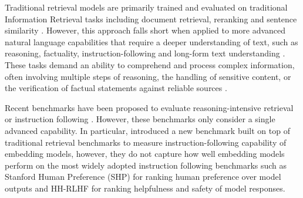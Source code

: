 


Traditional retrieval models are primarily trained and evaluated on traditional Information Retrieval tasks including document retrieval, reranking and sentence similarity \citep{muennighoff-etal-2023-mteb}. However, this approach falls short when applied to more advanced natural language capabilities that require a deeper understanding of text, such as reasoning, factuality, instruction-following and long-form text understanding \citep{su2024brightrealisticchallengingbenchmark, xiao2024rarbreasoningretrievalbenchmark, weller2024followirevaluatingteachinginformation}. These tasks demand an ability to comprehend and process complex information, often involving multiple steps of reasoning, the handling of sensitive content, or the verification of factual statements against reliable sources \citep{vu2024foundationalautoraterstaminglarge, ji2023beavertails, su2024brightrealisticchallengingbenchmark}. 

Recent benchmarks have been proposed to evaluate reasoning-intensive retrieval \citep{su2024brightrealisticchallengingbenchmark, xiao2024rarbreasoningretrievalbenchmark} or instruction following \citep{weller2024followirevaluatingteachinginformation}. However, these benchmarks only consider a single advanced capability. 
In particular, \citet{weller2024followirevaluatingteachinginformation} introduced a new benchmark built on top of traditional retrieval benchmarks to measure instruction-following capability of embedding models, however, they do not capture how well embedding models perform on the most widely adopted instruction following benchmarks such as Stanford Human Preference (SHP) \citep{pmlr-v162-ethayarajh22a} for ranking human preference over model outputs and HH-RLHF \citep{bai-etal-2022-hhrlhf} for ranking helpfulness and safety of model responses. 

